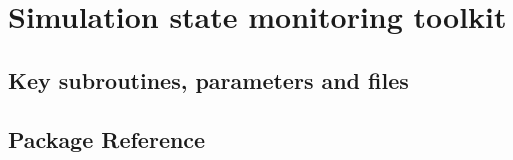 \section{Simulation state monitoring toolkit}
\label{sec:monitor}
\subsection{Key subroutines, parameters and files}
\label{sec:pkg:monitor:implementation_synopsis}
\subsection{Package Reference}
